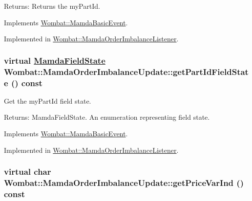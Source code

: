 \begin{Desc}
\item[Returns:]Returns the my\-Part\-Id. \end{Desc}


Implements \hyperlink{classWombat_1_1MamdaBasicEvent_94e531c6ae9ae7798725db14facbd6e2}{Wombat::Mamda\-Basic\-Event}.

Implemented in \hyperlink{classWombat_1_1MamdaOrderImbalanceListener_2f47719f14e5d1280791c8d832522589}{Wombat::Mamda\-Order\-Imbalance\-Listener}.\hypertarget{classWombat_1_1MamdaOrderImbalanceUpdate_20f8acc3d8d9fca3cf6db1ca24ef1980}{
\subsubsection[getPartIdFieldState]{\setlength{\rightskip}{0pt plus 5cm}virtual \hyperlink{namespaceWombat_93aac974f2ab713554fd12a1fa3b7d2a}{Mamda\-Field\-State} Wombat::Mamda\-Order\-Imbalance\-Update::get\-Part\-Id\-Field\-State () const}}
\label{classWombat_1_1MamdaOrderImbalanceUpdate_20f8acc3d8d9fca3cf6db1ca24ef1980}


Get the my\-Part\-Id field state. 

\begin{Desc}
\item[Returns:]Mamda\-Field\-State. An enumeration representing field state. \end{Desc}


Implements \hyperlink{classWombat_1_1MamdaBasicEvent_c361c99af2cf7eb9f5621d89f744fc62}{Wombat::Mamda\-Basic\-Event}.

Implemented in \hyperlink{classWombat_1_1MamdaOrderImbalanceListener_d8f5442d6f66c8a21c32581c66033146}{Wombat::Mamda\-Order\-Imbalance\-Listener}.\hypertarget{classWombat_1_1MamdaOrderImbalanceUpdate_922da85eb49fa7fa9753a2ef5b743f3c}{
\subsubsection[getPriceVarInd]{\setlength{\rightskip}{0pt plus 5cm}virtual char Wombat::Mamda\-Order\-Imbalance\-Update::get\-Price\-Var\-Ind () const}}
\label{classWombat_1_1MamdaOrderImbalanceUpdate_922da85eb49fa7fa9753a2ef5b743f3c}


